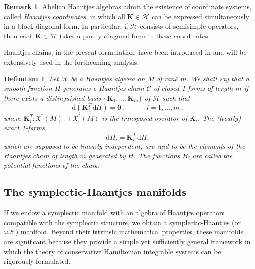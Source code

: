 \documentclass[10pt]{amsart}
\numberwithin{equation}{section}
\newcommand{\beq}{\begin{equation}}
\newcommand{\eeq}{\end{equation}}
\newcommand{\rd}{\mathrm{d}}
\newtheorem{definition}{Definition}
\theoremstyle{definition}
\newtheorem{remark}{\textbf{Remark}}
\begin{document}
\begin{remark}
Abelian Haantjes algebras admit the existence of coordinate systems, called \textit{Haantjes coordinates}, in which all $\boldsymbol{K}\in \mathscr{H}$ can be expressed simultaneously in a block-diagonal form. In particular, if $\mathscr{H}$ consists of semisimple operators, then each $\boldsymbol{K}\in \mathscr{H}$ takes a purely diagonal form in these coordinates \cite{TT2021JGP}. 
\end{remark}

Haantjes chains, in the present formulation, have been introduced in \cite{TT2022AMPA} and will be extensively used in the forthcoming analysis.
\begin{definition} \label{def:7}
 Let $\mathscr{H}$ be a Haantjes algebra on $M$ of rank $m$. We shall say that a smooth function $H$ generates a Haantjes chain $\mathscr{C}$ of closed 1-forms of length $m$ if there exists
a distinguished basis $\{\boldsymbol{K}_1, \ldots, \boldsymbol{K}_m\}$ of $\mathscr{H}$
 such that
\begin{equation} \label{eq:MHchain}
\rd (\boldsymbol{K}^T_i \,\rd H)=\boldsymbol{0} \ , \quad\qquad i=1,\ldots ,m \ ,
\end{equation}
where $\boldsymbol{K}^{T}_{i}: \mathfrak{X}^{*}(M) \to \mathfrak{X}^{*}(M)$ is the transposed operator of $\boldsymbol{K}_{i}$. The (locally) exact 1-forms 
\beq
\rd H_i=\boldsymbol{K}^T_i \,\rd H,
\eeq
which are supposed to be linearly independent, are said to be the elements of the Haantjes chain of length $m$ generated by $H$. The functions $H_i$ are called the potential functions of the chain.
\end{definition}



\subsection{The symplectic-Haantjes manifolds}
\label{subsec:2.3}
If we endow a symplectic manifold with an algebra of Haantjes operators compatible with the symplectic structure, we obtain a symplectic-Haantjes (or $\omega \mathscr{H}$) manifold. Beyond their intrinsic mathematical properties,  these manifolds are significant because they provide a simple yet sufficiently general framework in which the theory of conservative Hamiltonian integrable systems can be rigorously formulated.
\end{document}
